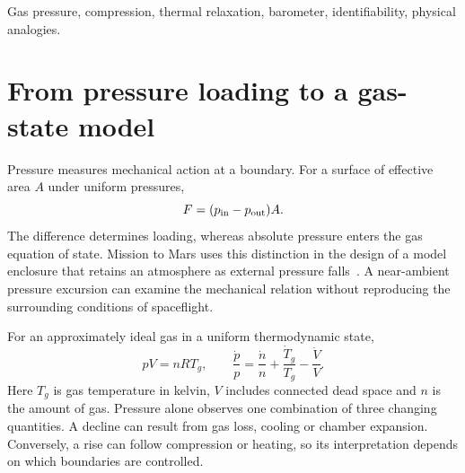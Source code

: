 \begin{abstract}
Pressure loading, compression and relaxation are different consequences of the same gas-state constraint. Independent enclosure examples give pressure excesses near 34.8~hPa for phone and BMP280 indications and 20.005~hPa for a T5400 indication. Their gradual declines quantify local relaxation, whose gas-flow interpretation depends on temperature and volume. A separate compression example rises by 75.03~hPa while the barometer die warms by 1.40~K. The observed pressure ratio is compatible with conditional isothermal and reversible adiabatic volume ratios of 0.93057 and 0.94990; their interpretation using chip thermometry depends on thermal coupling to the gas. A common measurement model connects these cases to force, gas amount and compression work, while separating per-device pressure compensation from reference calibration. Spacecraft enclosures and star formation supply physical contexts whose additional boundary conditions must remain explicit.
\end{abstract}
\begin{IEEEkeywords}
Gas pressure, compression, thermal relaxation, barometer, identifiability, physical analogies.
\end{IEEEkeywords}

\section{From pressure loading to a gas-state model}
Pressure measures mechanical action at a boundary. For a surface of effective area $A$ under uniform pressures,
\begin{equation}
 F=(p_{\rm in}-p_{\rm out})A.
 \label{eq:mission-to-mars-force}
\end{equation}
The difference determines loading, whereas absolute pressure enters the gas equation of state. Mission to Mars uses this distinction in the design of a model enclosure that retains an atmosphere as external pressure falls~\cite{mars2022}. A near-ambient pressure excursion can examine the mechanical relation without reproducing the surrounding conditions of spaceflight.

For an approximately ideal gas in a uniform thermodynamic state,
\begin{equation}
 pV=nRT_g,\qquad
 \frac{\dot p}{p}=\frac{\dot n}{n}+\frac{\dot T_g}{T_g}-\frac{\dot V}{V}.
 \label{eq:mission-to-mars-state}
\end{equation}
Here $T_g$ is gas temperature in kelvin, $V$ includes connected dead space and $n$ is the amount of gas. Pressure alone observes one combination of three changing quantities. A decline can result from gas loss, cooling or chamber expansion. Conversely, a rise can follow compression or heating, so its interpretation depends on which boundaries are controlled.

